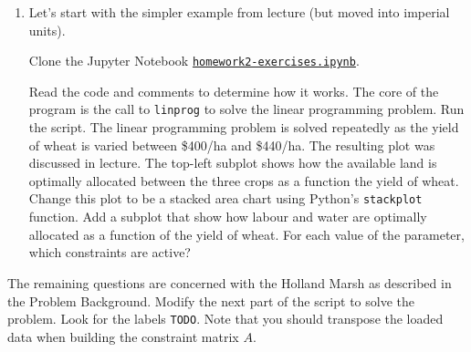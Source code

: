 \documentclass[letter]{article}
\begin{document}
\begin{enumerate}[label=\textbf{\arabic*.}]
	\item Let's start with the simpler example from lecture (but moved into imperial units). 

	Clone the Jupyter Notebook \href{https://utoronto.syzygy.ca/jupyter/user-redirect/git-pull?repo=https://github.com/bigfatbernie/IBLMathModeling&subPath=homeworks/homework2/homework2-exercises.ipynb}{\tt homework2-exercises.ipynb}.
	
	Read the code and comments to determine how it works. The core of the program is the call to \verb|linprog| to solve the linear programming problem. Run the script. The linear programming problem is solved repeatedly as the yield of wheat is varied between \$400/ha and \$440/ha. The resulting plot was discussed in lecture. The top-left subplot shows how the available land is optimally allocated between the three crops as a function the yield of wheat. Change this plot to be a stacked area chart using Python's \verb|stackplot| function. Add a subplot that show how labour and water are optimally allocated as a function of the yield of wheat. For each value of the parameter, which constraints are active? 
\end{enumerate}

The remaining questions are concerned with the Holland Marsh as described in the Problem Background. 
	Modify the next part of the script to solve the problem. Look for the labels \verb|TODO|. 
	Note that you should transpose the loaded data when building the constraint matrix $A$.
\end{document}
